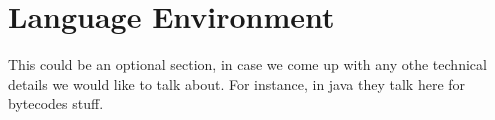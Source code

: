 \section{Language Environment}
\label{sect:tech}
This could be an optional section, in case we come
up with any othe technical details we would like to
talk about. For instance, in java they talk here for
bytecodes stuff.
